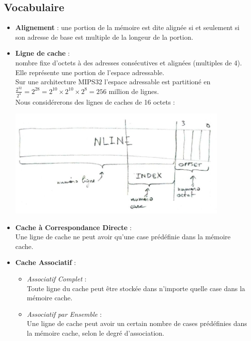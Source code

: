 \subsection{Vocabulaire}

\begin{itemize}
  \item {\bf Alignement} : une portion de la mémoire est dite alignée si et
  seulement si son adresse de base est multiple de la longeur de la portion.

  \item {\bf Ligne de cache} :\\
  nombre fixe d'octets à des adresses consécutives et alignées (multiples de 4).
  Elle représente une portion de l'espace adressable.\\
  Sur une architecture MIPS32 l'espace adressable est partitioné en
  $\frac{2^{32}}{2^4}={2}^{28}={2}^{10}\times{2}^{10}\times{2}^{8}=256$ million
  de lignes.\\
  Nous considérerons des lignes de caches de 16 octets : \\
  \begin{center}
    \includegraphics[width=11cm]{cours3/pics/adress.jpg}
  \end{center}
  \item {\bf Cache à Correspondance Directe} :\\
  Une ligne de cache ne peut avoir qu'une case prédéfinie dans la mémoire cache.

  \item {\bf Cache Associatif} :\\
  \begin{itemize}
    \item {\it Associatif Complet} :\\
    Toute ligne du cache peut être stockée dans n'importe quelle case dans la
    mémoire cache.
    \item {\it Associatif par Ensemble} :\\
    Une ligne de cache peut avoir un certain nombre de cases prédéfinies dans la
    mémoire cache, selon le degré d'association.
  \end{itemize}


\end{itemize}
